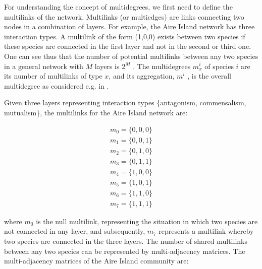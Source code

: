 For understanding the concept of multidegrees, we first need to define the multilinks of the network. Multilinks (or multiedges) are links connecting two nodes in a combination of layers. For example, the Aire Island network has three interaction types. A multilink of the form (1,0,0) exists between two species if these species are connected in the first layer and not in the second or third one. One can see thus that the number of potential multilinks between any two species in a general network with  $M$  layers is  $2^M$  . The multidegrees  $m_x^i$ of species  $i$ are its number of multilinks of type  $x$, and its aggregation,  $m^i$  , is the overall multidegree as considered e.g. in \cite{Stella2016}.

Given three layers representing interaction types \{antagonism, commensalism, mutualism\}, the multilinks for the Aire Island network are:

\begin{equation*}
\begin{matrix}m_0=\{0,0,0\}\\m_1=\{0,0,1\}\\m_2=\{0,1,0\}\\m_3=\{0,1,1\}\\m_4=\{1,0,0\}\\m_5=\{1,0,1\}\\m_6=\{1,1,0\}\\m_7=\{1,1,1\}\end{matrix}
\end{equation*}

where  $m_0$ is the null multilink, representing the situation in which two species are not connected in any layer, and subsequently,  $m_7$ represents a multilink whereby two species are connected in the three layers. The number of shared multilinks between any two species can be represented by multi-adjacency matrices. The multi-adjacency matrices of the Aire Island community are:

